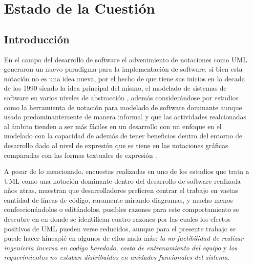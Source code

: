 \chapter{Estado de la Cuestión}%
\label{sec:estadodelacuestion}

\section{Introducción}
\label{sec:problematica}
En el campo del desarrollo de software el advenimiento de notaciones como UML
generaron un nuevo paradigma para la implementación de software, si bien esta
notación no es una idea nueva, por el hecho de que tiene sus inicios en la decada de los
1990 siendo la idea principal del mismo, el modelado de sistemas de software en
varios niveles de abstracción  \cite{chaudron2017}, además considerándose por
estudios como la herramienta de notación para modelado de software dominante
\cite{aldaeej2016} aunque usado predominantemente de manera informal y que las
actividades realcionadas al ámbito tienden a ser
más fáciles en un desarrollo con un enfoque en el modelado \cite{forward2010}
con la capacidad de además de tener beneficios dentro del entorno de desarrollo
dado al nivel de expresión que se tiene en las
notaciones gráficas comparadas con las formas textuales de expresión
\cite{rumpe2004}.

A pesar de lo mencionado, encuestas realizadas en uno de los estudios que trata
a UML como una notación dominante dentro del desarrollo de software realizada años
atras, muestran que desarrolladores prefieren centrar el trabajo en vastas
cantidad de líneas de código, raramente mirando diagramas, y mucho menos
confeccionándolos o editándolos, posibles razones para este
comportamiento se descubre en \cite{bente2006} en donde se identifican cuatro
razones por las cuales los efectos positivos de UML pueden verse reducidos,
aunque para el presente trabajo se puede hacer hincapié en algunos de ellos
nada más:
\textit{la no-factibilidad de realizar ingenieria inversa en codigo heredado},
\textit{costo de entrenamiento del equipo} y \textit{los requerimientos no
estaban distribuidos en unidades funcionales del sistema}.

